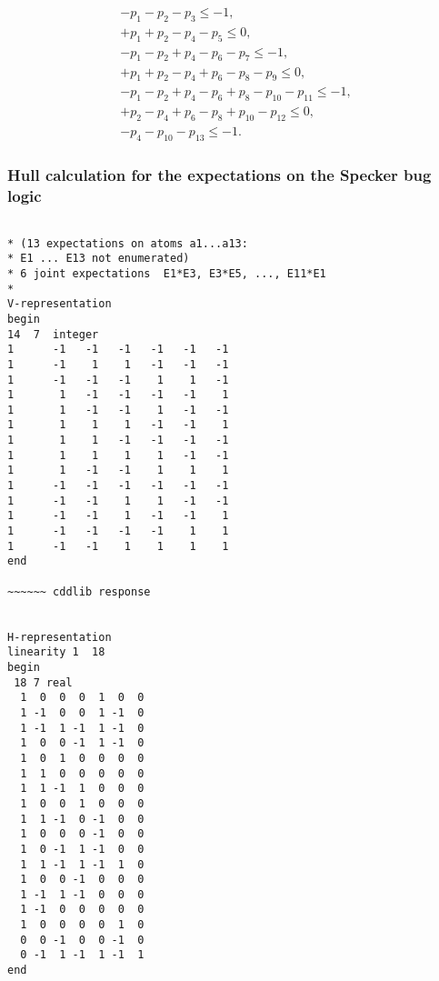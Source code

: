\documentclass[%
 showpacs,
 showkeys,
 preprintnumbers,
 amsmath,amssymb,
 aps,
  pra,
  longbibliography,
 floatfix,
 ]{revtex4-1}
\begin{document}
\begin{eqnarray}
- p_1  - p_2  - p_3                                                                                        \le    -1 , \\
+ p_1  + p_2         - p_4  - p_5                                                                          \le     0 , \\
- p_1  - p_2         + p_4         - p_6  - p_7                                                            \le    -1 ,  \\
+ p_1  + p_2         - p_4         + p_6         - p_8  - p_9                                              \le     0 , \\
- p_1  - p_2         + p_4         - p_6         + p_8         - p_{10}  - p_{11}                          \le    -1 ,  \\
       + p_2         - p_4         + p_6         - p_8         + p_{10}            - p_{12}                \le     0 , \\
                     - p_4                                     - p_{10}                      - p_{13}      \le    -1
.
\label{2017-b-sb-p-c}
\end{eqnarray}

\subsubsection{Hull calculation for the expectations on the Specker bug logic}

{ \begin{lstlisting}[backgroundcolor=\color{yellow!10},framerule=0pt,breaklines=true, frame=tb]

* (13 expectations on atoms a1...a13:
* E1 ... E13 not enumerated)
* 6 joint expectations  E1*E3, E3*E5, ..., E11*E1
*
V-representation
begin
14  7  integer
1      -1   -1   -1   -1   -1   -1
1      -1    1    1   -1   -1   -1
1      -1   -1   -1    1    1   -1
1       1   -1   -1   -1   -1    1
1       1   -1   -1    1   -1   -1
1       1    1    1   -1   -1    1
1       1    1   -1   -1   -1   -1
1       1    1    1    1   -1   -1
1       1   -1   -1    1    1    1
1      -1   -1   -1   -1   -1   -1
1      -1   -1    1    1   -1   -1
1      -1   -1    1   -1   -1    1
1      -1   -1   -1   -1    1    1
1      -1   -1    1    1    1    1
end

~~~~~~ cddlib response


H-representation
linearity 1  18
begin
 18 7 real
  1  0  0  0  1  0  0
  1 -1  0  0  1 -1  0
  1 -1  1 -1  1 -1  0
  1  0  0 -1  1 -1  0
  1  0  1  0  0  0  0
  1  1  0  0  0  0  0
  1  1 -1  1  0  0  0
  1  0  0  1  0  0  0
  1  1 -1  0 -1  0  0
  1  0  0  0 -1  0  0
  1  0 -1  1 -1  0  0
  1  1 -1  1 -1  1  0
  1  0  0 -1  0  0  0
  1 -1  1 -1  0  0  0
  1 -1  0  0  0  0  0
  1  0  0  0  0  1  0
  0  0 -1  0  0 -1  0
  0 -1  1 -1  1 -1  1
end

\end{lstlisting}  }
\end{document}
